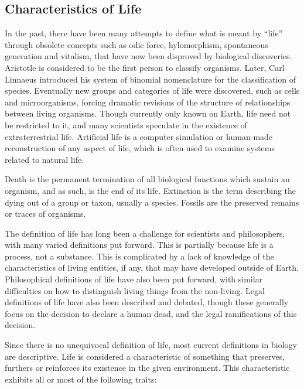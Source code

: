 \documentclass[
]{article}
\begin{document}
\hypertarget{characteristics-of-life}{%
\subsection{Characteristics of Life}\label{characteristics-of-life}}

In the past, there have been many attempts to define what is meant by
``life'' through obsolete concepts such as odic force, hylomorphism,
spontaneous generation and vitalism, that have now been disproved by
biological discoveries. Aristotle is considered to be the first person
to classify organisms. Later, Carl Linnaeus introduced his system of
binomial nomenclature for the classification of species. Eventually new
groups and categories of life were discovered, such as cells and
microorganisms, forcing dramatic revisions of the structure of
relationships between living organisms. Though currently only known on
Earth, life need not be restricted to it, and many scientists speculate
in the existence of extraterrestrial life. Artificial life is a computer
simulation or human-made reconstruction of any aspect of life, which is
often used to examine systems related to natural life.

Death is the permanent termination of all biological functions which
sustain an organism, and as such, is the end of its life. Extinction is
the term describing the dying out of a group or taxon, usually a
species. Fossils are the preserved remains or traces of organisms.

The definition of life has long been a challenge for scientists and
philosophers, with many varied definitions put forward. This is
partially because life is a process, not a substance. This is
complicated by a lack of knowledge of the characteristics of living
entities, if any, that may have developed outside of Earth.
Philosophical definitions of life have also been put forward, with
similar difficulties on how to distinguish living things from the
non-living. Legal definitions of life have also been described and
debated, though these generally focus on the decision to declare a human
dead, and the legal ramifications of this decision.

Since there is no unequivocal definition of life, most current
definitions in biology are descriptive. Life is considered a
characteristic of something that preserves, furthers or reinforces its
existence in the given environment. This characteristic exhibits all or
most of the following traits:
\end{document}
